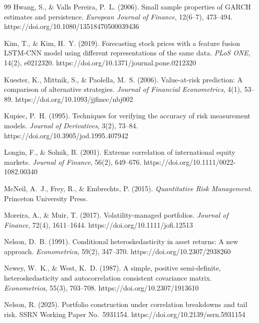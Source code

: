 \documentclass[12pt,a4paper]{article}
\begin{document}
\begin{thebibliography}{99}
Hwang, S., \& Valls Pereira, P.~L. (2006). Small sample properties of GARCH estimates and persistence. \textit{European Journal of Finance}, 12(6--7), 473--494. https://doi.org/10.1080/13518470500039436

Kim, T., \& Kim, H.~Y. (2019). Forecasting stock prices with a feature fusion LSTM-CNN model using different representations of the same data. \textit{PLoS ONE}, 14(2), e0212320. https://doi.org/10.1371/journal.pone.0212320

Kuester, K., Mittnik, S., \& Paolella, M.~S. (2006). Value-at-risk prediction: A comparison of alternative strategies. \textit{Journal of Financial Econometrics}, 4(1), 53--89. https://doi.org/10.1093/jjfinec/nbj002

Kupiec, P.~H. (1995). Techniques for verifying the accuracy of risk measurement models. \textit{Journal of Derivatives}, 3(2), 73--84. https://doi.org/10.3905/jod.1995.407942

Longin, F., \& Solnik, B. (2001). Extreme correlation of international equity markets. \textit{Journal of Finance}, 56(2), 649--676. https://doi.org/10.1111/0022-1082.00340

McNeil, A.~J., Frey, R., \& Embrechts, P. (2015). \textit{Quantitative Risk Management}. Princeton University Press.

Moreira, A., \& Muir, T. (2017). Volatility-managed portfolios. \textit{Journal of Finance}, 72(4), 1611--1644. https://doi.org/10.1111/jofi.12513

Nelson, D.~B. (1991). Conditional heteroskedasticity in asset returns: A new approach. \textit{Econometrica}, 59(2), 347--370. https://doi.org/10.2307/2938260

Newey, W.~K., \& West, K.~D. (1987). A simple, positive semi-definite, heteroskedasticity and autocorrelation consistent covariance matrix. \textit{Econometrica}, 55(3), 703--708. https://doi.org/10.2307/1913610

Nelson, R. (2025). Portfolio construction under correlation breakdowns and tail risk. SSRN Working Paper No.~5931154. https://doi.org/10.2139/ssrn.5931154


\end{thebibliography}
\end{document}

